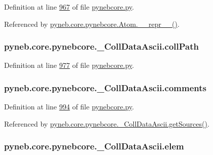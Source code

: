Definition at line \hyperlink{pynebcore_8py_source_l00967}{967} of file \hyperlink{pynebcore_8py_source}{pynebcore.\-py}.



Referenced by \hyperlink{pynebcore_8py_source_l02615}{pyneb.\-core.\-pynebcore.\-Atom.\-\_\-\-\_\-repr\-\_\-\-\_\-()}.

\hypertarget{classpyneb_1_1core_1_1pynebcore_1_1___coll_data_ascii_aa407510c78da8c376cd7d82a2ec87ba4}{
\subsubsection[{coll\-Path}]{\setlength{\rightskip}{0pt plus 5cm}pyneb.\-core.\-pynebcore.\-\_\-\-Coll\-Data\-Ascii.\-coll\-Path}}\label{classpyneb_1_1core_1_1pynebcore_1_1___coll_data_ascii_aa407510c78da8c376cd7d82a2ec87ba4}


Definition at line \hyperlink{pynebcore_8py_source_l00977}{977} of file \hyperlink{pynebcore_8py_source}{pynebcore.\-py}.

\hypertarget{classpyneb_1_1core_1_1pynebcore_1_1___coll_data_ascii_ace4b313bdacd14dea0112b9ff7fe0b7c}{
\subsubsection[{comments}]{\setlength{\rightskip}{0pt plus 5cm}pyneb.\-core.\-pynebcore.\-\_\-\-Coll\-Data\-Ascii.\-comments}}\label{classpyneb_1_1core_1_1pynebcore_1_1___coll_data_ascii_ace4b313bdacd14dea0112b9ff7fe0b7c}


Definition at line \hyperlink{pynebcore_8py_source_l00994}{994} of file \hyperlink{pynebcore_8py_source}{pynebcore.\-py}.



Referenced by \hyperlink{pynebcore_8py_source_l01022}{pyneb.\-core.\-pynebcore.\-\_\-\-Coll\-Data\-Ascii.\-get\-Sources()}.

\hypertarget{classpyneb_1_1core_1_1pynebcore_1_1___coll_data_ascii_a2e7f8f27e94e2aa068d869cd4dad2ee2}{
\subsubsection[{elem}]{\setlength{\rightskip}{0pt plus 5cm}pyneb.\-core.\-pynebcore.\-\_\-\-Coll\-Data\-Ascii.\-elem}}\label{classpyneb_1_1core_1_1pynebcore_1_1___coll_data_ascii_a2e7f8f27e94e2aa068d869cd4dad2ee2}


